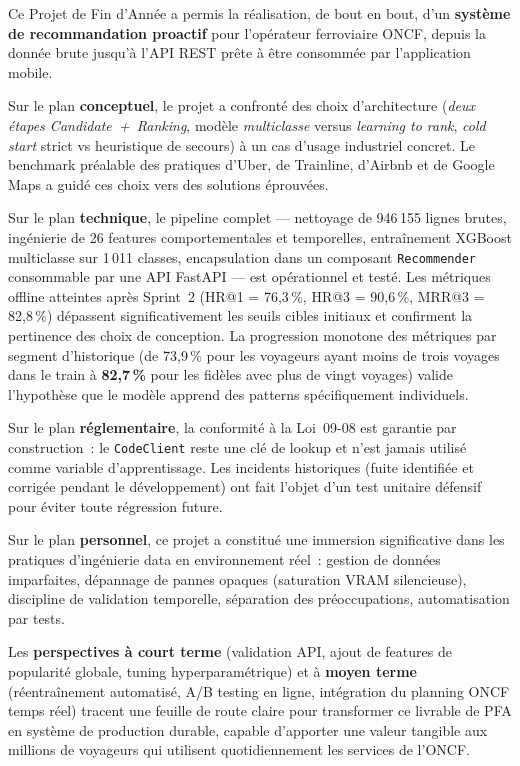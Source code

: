 \documentclass[11pt, a4paper]{article}
\begin{document}
Ce Projet de Fin d'Année a permis la réalisation, de bout en bout,
d'un \textbf{système de recommandation proactif} pour l'opérateur
ferroviaire ONCF, depuis la donnée brute jusqu'à l'API REST prête à
être consommée par l'application mobile.

Sur le plan \textbf{conceptuel}, le projet a confronté des choix
d'architecture (\textit{deux étapes Candidate~+~Ranking}, modèle
\textit{multiclasse} versus \textit{learning to rank}, \textit{cold
start} strict vs heuristique de secours) à un cas d'usage
industriel concret. Le benchmark préalable des pratiques d'Uber, de
Trainline, d'Airbnb et de Google Maps a guidé ces choix vers des
solutions éprouvées.

Sur le plan \textbf{technique}, le pipeline complet --- nettoyage de
946\,155 lignes brutes, ingénierie de 26 features comportementales et
temporelles, entraînement XGBoost multiclasse sur 1\,011 classes,
encapsulation dans un composant \texttt{Recommender} consommable par
une API FastAPI --- est opérationnel et testé. Les métriques offline
atteintes après Sprint~2 (HR@1 = 76{,}3\,\%, HR@3 = 90{,}6\,\%, MRR@3 = 82{,}8\,\%)
dépassent significativement les seuils cibles initiaux et confirment
la pertinence des choix de conception. La progression monotone des
métriques par segment d'historique (de 73{,}9\,\% pour les voyageurs
ayant moins de trois voyages dans le train à \textbf{82{,}7\,\%} pour les
fidèles avec plus de vingt voyages) valide l'hypothèse que le modèle
apprend des patterns spécifiquement individuels.

Sur le plan \textbf{réglementaire}, la conformité à la Loi~09-08 est
garantie par construction~: le \texttt{CodeClient} reste une clé de
lookup et n'est jamais utilisé comme variable d'apprentissage. Les
incidents historiques (fuite identifiée et corrigée pendant le
développement) ont fait l'objet d'un test unitaire défensif pour éviter
toute régression future.

Sur le plan \textbf{personnel}, ce projet a constitué une immersion
significative dans les pratiques d'ingénierie data en environnement
réel~: gestion de données imparfaites, dépannage de pannes opaques
(saturation VRAM silencieuse), discipline de validation temporelle,
séparation des préoccupations, automatisation par tests.

Les \textbf{perspectives à court terme} (validation API, ajout de
features de popularité globale, tuning hyperparamétrique) et à
\textbf{moyen terme} (réentraînement automatisé, A/B testing en ligne,
intégration du planning ONCF temps réel) tracent une feuille de route
claire pour transformer ce livrable de PFA en système de production
durable, capable d'apporter une valeur tangible aux millions de
voyageurs qui utilisent quotidiennement les services de l'ONCF.
\end{document}
